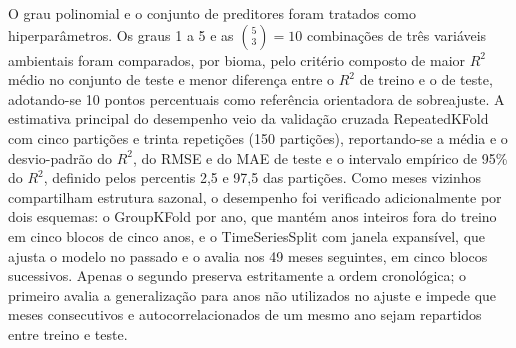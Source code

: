 \documentclass[a4paper,fleqn]{cas-sc}
\begin{document}
O grau polinomial e o conjunto de preditores foram tratados como hiperparâmetros. Os graus 1 a 5 e as $\binom{5}{3} = 10$ combinações de três variáveis ambientais foram comparados, por bioma, pelo critério composto de maior $R^2$ médio no conjunto de teste e menor diferença entre o $R^2$ de treino e o de teste, adotando-se 10 pontos percentuais como referência orientadora de sobreajuste. A estimativa principal do desempenho veio da validação cruzada RepeatedKFold com cinco partições e trinta repetições (150 partições), reportando-se a média e o desvio-padrão do $R^2$, do RMSE e do MAE de teste e o intervalo empírico de 95\% do $R^2$, definido pelos percentis 2,5 e 97,5 das partições. Como meses vizinhos compartilham estrutura sazonal, o desempenho foi verificado adicionalmente por dois esquemas: o GroupKFold por ano, que mantém anos inteiros fora do treino em cinco blocos de cinco anos, e o TimeSeriesSplit com janela expansível, que ajusta o modelo no passado e o avalia nos 49 meses seguintes, em cinco blocos sucessivos. Apenas o segundo preserva estritamente a ordem cronológica; o primeiro avalia a generalização para anos não utilizados no ajuste e impede que meses consecutivos e autocorrelacionados de um mesmo ano sejam repartidos entre treino e teste.
\end{document}
